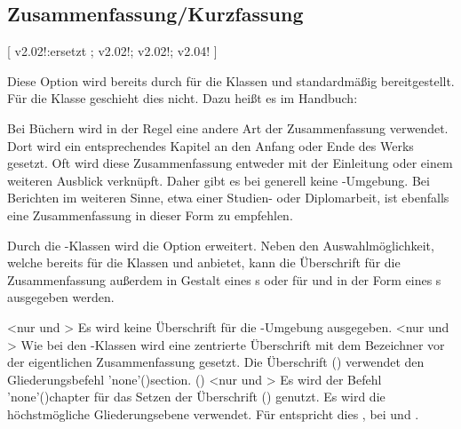 \begin{DeclareEntity*}{}
\begin{DeclareEntity*}{}
\begin{DeclareEntity*}{}
\subsection{%
  Zusammenfassung/Kurzfassung%
}

\begin{Declaration}
  {}
[%
  v2.02!:ersetzt ;%
  v2.02!;%
  v2.02!;%
  v2.04!%
]
\printdeclarationlist

Diese Option wird bereits durch \KOMAScript{} für die Klassen  
und  standardmäßig bereitgestellt. Für die Klasse 
 geschieht dies nicht. Dazu heißt es im Handbuch:
%
\begin{quoting}
Bei Büchern wird in der Regel eine andere Art der Zusammenfassung verwendet. 
Dort wird ein entsprechendes Kapitel an den Anfang oder Ende des Werks gesetzt. 
Oft wird diese Zusammenfassung entweder mit der Einleitung oder einem weiteren 
Ausblick verknüpft. Daher gibt es bei  generell keine 
-Umgebung. Bei Berichten im weiteren Sinne, etwa einer 
Studien- oder Diplomarbeit, ist ebenfalls eine Zusammenfassung in dieser Form 
zu empfehlen.
\end{quoting}
%
Durch die \TUDScript-Klassen wird die Option  erweitert. 
Neben den Auswahlmöglichkeit, welche bereits \KOMAScript{} für die Klassen 
 und  anbietet, kann die Überschrift für 
die Zusammenfassung außerdem in Gestalt eines \sectionautorefname{}s oder für 
 und  in der Form eines 
\chapterautorefname{}s ausgegeben werden.
\begin{DeclareValues}{}
<nur  und >
  Es wird keine Überschrift für die -Umgebung ausgegeben.
<nur  und >
  Wie bei den \KOMAScript-Klassen wird eine zentrierte Überschrift mit dem 
  Bezeichner  vor der eigentlichen Zusammenfassung gesetzt.
  Die Überschrift () verwendet den Gliederungsbefehl 
  \Macro'none'(){section}.
()
    <nur  und >
  Es wird der Befehl \Macro'none'(){chapter} für das 
  Setzen der Überschrift () genutzt. 
  Es wird die höchstmögliche Gliederungsebene verwendet. Für 
   entspricht dies , bei 
   und  .
\end{DeclareValues}


\end{Declaration}
\end{DeclareEntity*}
\end{DeclareEntity*}
\end{DeclareEntity*}

